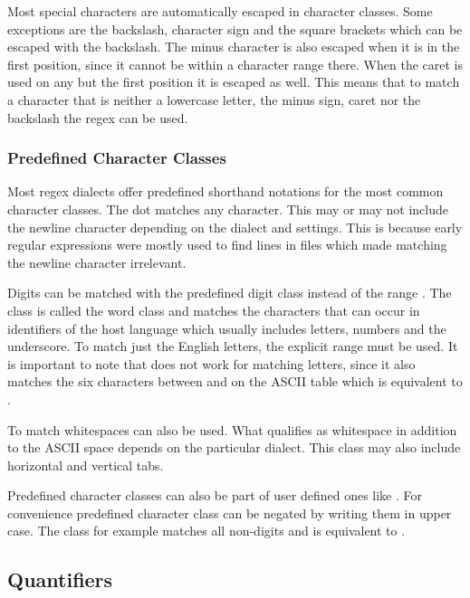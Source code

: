 Most special characters are automatically escaped in character classes. Some exceptions are the backslash, character sign and the square brackets which can be escaped with the backslash. The minus character is also escaped when it is in the first position, since it cannot be within a character range there. When the caret is used on any but the first position it is escaped as well. This means that to match a character that is neither a lowercase letter, the minus sign, caret nor the backslash the regex  can be used.

\subsubsection{Predefined Character Classes}

Most regex dialects offer predefined shorthand notations for the most common character classes. The dot  matches any character. This may or may not include the newline character depending on the dialect and settings. This is because early regular expressions were mostly used to find lines in files which made matching the newline character irrelevant. 

Digits can be matched with the predefined digit class  instead of the range \pattern{[0-9]}. The class  is called the word class and matches the characters that can occur in identifiers of the host language which usually includes letters, numbers and the underscore. To match just the English letters, the explicit range \pattern{[a-zA-Z]} must be used. It is important to note that  does not work for matching letters, since it also matches the six characters between  and  on the ASCII table which is equivalent to \pattern{[A-Za-z[\\]\caret\_`]}.

To match whitespaces  can also be used. What qualifies as whitespace in addition to the ASCII space \inp{ } depends on the particular dialect. This class may also include horizontal and vertical tabs.

Predefined character classes can also be part of user defined ones like \pattern{[A-Za-z\bs d]}. For convenience predefined character class can be negated by writing them in upper case. The class  for example matches all non-digits and is equivalent to \pattern{[\caret \bs d]}.

\subsection{Quantifiers} \label{sec:introQuantifiers}

